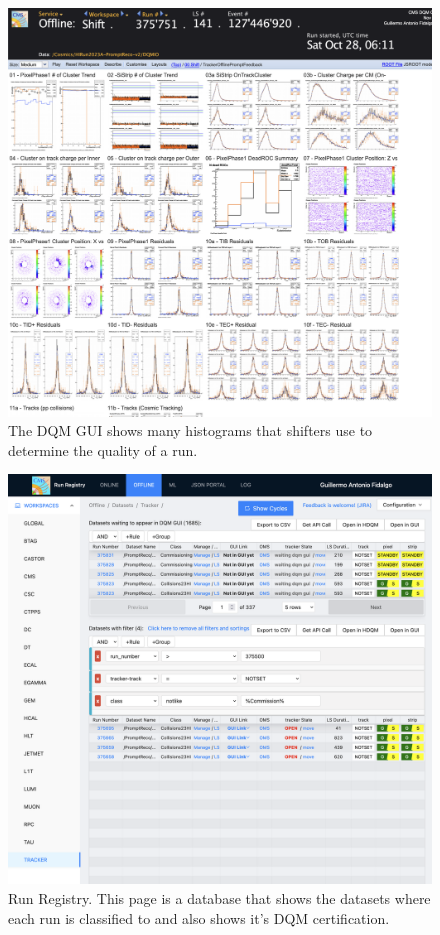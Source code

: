 \begin{figure}
	\includegraphics*[width=\linewidth,trim= 0 7in 1in 0 ]{Images/DQM GUI.png}
	\caption{The DQM GUI shows many histograms that shifters use to determine the quality of a run.}
	\label{fig:dqmgui}
\end{figure}

\begin{figure}
	\includegraphics*[width=\linewidth,trim= 2.9in 4.4in 0 0in]{Images/RR.png}
	\caption{Run Registry. This page is a database that shows the datasets where each run is classified to and also shows it's DQM certification.}
	\label{fig:RR}
\end{figure}



